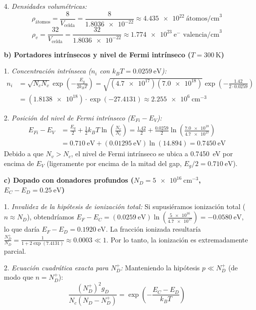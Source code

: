 \begin{problema}
4. \textit{Densidades volumétricas:}
\[
\rho_{\text{átomos}} = \frac{8}{V_{\text{celda}}} = \frac{8}{\num{1.8036e-22}} \approx \SI{4.435e22}{\text{átomos/cm}^3}
\]
\[
\rho_v = \frac{32}{V_{\text{celda}}} = \frac{32}{\num{1.8036e-22}} \approx \SI{1.774e23}{\text{e}^-\text{ valencia/cm}^3}
\]

\textbf{b) Portadores intrínsecos y nivel de Fermi intrínseco ($T = \SI{300}{\kelvin}$)}

1. \textit{Concentración intrínseca ($n_i$ con $k_B T = \SI{0.0259}{\eV}$):}
\[
\begin{array}{rl}
    n_i & \displaystyle = \sqrt{N_c N_v} \exp\left( -\frac{E_g}{2 k_B T} \right) = \sqrt{(\num{4.7e17})(\num{7.0e18})} \exp\left( -\frac{1.42}{2 \cdot 0.0259} \right) \\[16pt]
    & \displaystyle = (\num{1.8138e18}) \cdot \exp(-27.4131) \approx \SI{2.255e6}{\cm^{-3}}
\end{array}
\]

2. \textit{Posición del nivel de Fermi intrínseco ($E_{Fi} - E_V$):}
\[
\begin{array}{rl}
    E_{Fi} - E_V & \displaystyle = \frac{E_g}{2} + \frac{1}{2} k_B T \ln\left( \frac{N_v}{N_c} \right) = \frac{1.42}{2} + \frac{0.0259}{2} \ln\left( \frac{\num{7.0e18}}{\num{4.7e17}} \right) \\[16pt]
    & \displaystyle = \SI{0.710}{\eV} + (\SI{0.01295}{\eV}) \ln(14.894) = \SI{0.7450}{\eV}
\end{array}
\]
Debido a que $N_v > N_c$, el nivel de Fermi intrínseco se ubica a \SI{0.7450}{\eV} por encima de $E_V$ (ligeramente por encima de la mitad del gap, $E_g/2 = \SI{0.710}{\eV}$).

\textbf{c) Dopado con donadores profundos ($N_D = \SI{5e16}{\cm^{-3}}$, $E_C - E_D = \SI{0.25}{\eV}$)}

1. \textit{Invalidez de la hipótesis de ionización total:}
Si supusiéramos ionización total ($n \approx N_D$), obtendríamos $E_F - E_C = (\SI{0.0259}{\eV}) \ln\left(\frac{\num{5e16}}{\num{4.7e17}}\right) = \SI{-0.0580}{\eV}$, lo que daría $E_F - E_D = \SI{0.1920}{\eV}$. La fracción ionizada resultaría $\frac{N_D^+}{N_D} = \frac{1}{1 + 2 \exp(7.4131)} \approx \num{0.0003} \ll 1$. Por lo tanto, la ionización es extremadamente parcial.

2. \textit{Ecuación cuadrática exacta para $N_D^+$:}
Manteniendo la hipótesis $p \ll N_D^+$ (de modo que $n = N_D^+$):
\[
\frac{(N_D^+)^2 g_D}{N_c (N_D - N_D^+)} = \exp\left( -\frac{E_C - E_D}{k_B T} \right)
\]


\end{problema}
